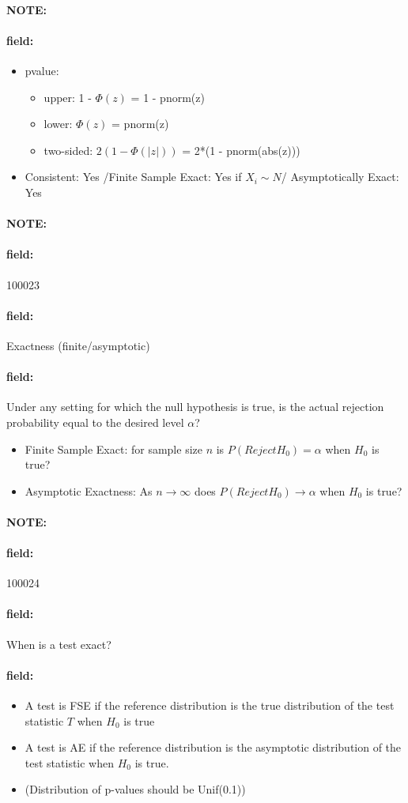 \documentclass[12pt]{article}
\newenvironment{note}{\paragraph{NOTE:}}{}
\newenvironment{field}{\paragraph{field:}}{}
\begin{document}
\begin{note}
\begin{field}
\begin{itemize}
   \item pvalue:
         \begin{itemize}
          \item upper: 1 - $\Phi(z)$ = 1 - pnorm(z)
          \item lower: $\Phi(z)$ = pnorm(z)
          \item two-sided: $2(1 - \Phi(|z|))$ = 2*(1 - pnorm(abs(z)))
         \end{itemize}
   \item Consistent: Yes /Finite Sample Exact: Yes if $X_i \sim N$/ Asymptotically Exact: Yes
  \end{itemize}
 \end{field}
\end{note}

\begin{note} \begin{field} \tiny 100023 \end{field}
 \begin{field}
  Exactness (finite/asymptotic)
 \end{field}
 \begin{field}
  Under any setting for which the null hypothesis is true, is the actual rejection probability equal to the desired level $\alpha$?
  \begin{itemize}
   \item Finite Sample Exact: for sample size $n$ is $P(Reject H_0) = \alpha$ when $H_0$ is true?
   \item Asymptotic Exactness: As $n \to \infty$ does $P(Reject H_0) \to \alpha$ when $H_0$ is true?
  \end{itemize}
 \end{field}
\end{note}

\begin{note} \begin{field} \tiny 100024 \end{field}
 \begin{field}
  When is a test exact?
 \end{field}
 \begin{field}
  \begin{itemize}
   \item A test is FSE if the reference distribution is the true distribution of the test statistic $T$ when $H_0$ is true
   \item A test is AE if the reference distribution is the asymptotic distribution of the test statistic when $H_0$ is true.
   \item (Distribution of p-values should be Unif(0.1))
  \end{itemize}
 \end{field}
\end{note}
\end{document}
